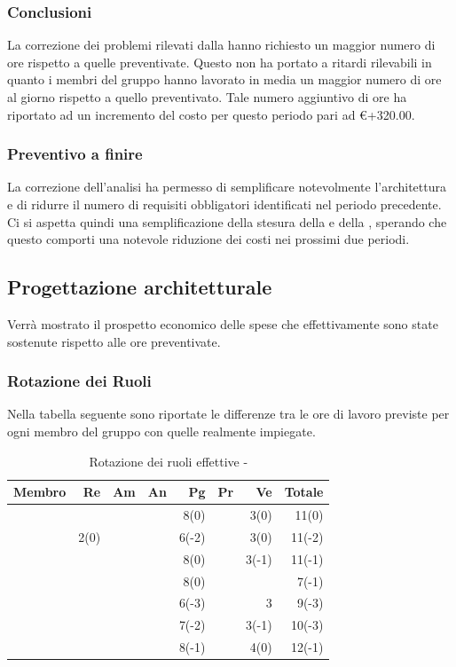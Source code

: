 \documentclass[12pt,a4paper]{article}
\begin{document}
\subsubsection{Conclusioni}
La correzione dei problemi rilevati dalla \RR{} hanno richiesto un maggior numero di ore rispetto a quelle preventivate. Questo non ha portato a ritardi rilevabili in quanto i membri del gruppo hanno lavorato in media un maggior numero di ore al giorno rispetto a quello preventivato. Tale numero aggiuntivo di ore ha riportato ad un incremento del costo per questo periodo pari ad \euro{}+320.00.

\subsubsection{Preventivo a finire}
La correzione dell'analisi ha permesso di semplificare notevolmente l'architettura e di ridurre il numero di requisiti obbligatori identificati nel periodo precedente.
Ci si aspetta quindi una semplificazione della stesura della \ST{} e della \DP{}, sperando che questo comporti una notevole riduzione dei costi nei prossimi due periodi. 

\newpage

\subsection{Progettazione architetturale}
Verrà mostrato il prospetto economico delle spese che effettivamente sono state sostenute rispetto alle ore preventivate.

\subsubsection{Rotazione dei Ruoli}
Nella tabella seguente sono riportate le differenze tra le ore di lavoro previste per ogni membro del gruppo con quelle realmente impiegate.

\begin{table}[H]
	\begin{center}
		\begin{tabular}{l r r r r r r r}
			\toprule
			\textbf{Membro}	&	\textbf{Re}	&	\textbf{Am}	& \textbf{An} & \textbf{Pg} & \textbf{Pr} & \textbf{Ve} & \textbf{Totale}\\
			\midrule
			\midrule
            \IB{} & & & & 8(0) & & 3(0) & 11(0) \\
			\midrule
            \AB{} & 2(0) & & & 6(-2) & & 3(0) & 11(-2) \\
			\midrule
            \NDC{} & & & & 8(0) & & 3(-1) & 11(-1) \\
			\midrule
            \TP{} & & & & 8(0) & & & 7(-1) \\
			\midrule
            \WS{} & & & & 6(-3) & & 3 & 9(-3) \\
			\midrule
            \AVE{} & & & & 7(-2) & & 3(-1) & 10(-3) \\
			\midrule
            \AVI{} & & & & 8(-1) & & 4(0) & 12(-1) \\
			\bottomrule
		\end{tabular}
		\caption{Rotazione dei ruoli effettive - \FPA{}}
	\end{center}
\end{table}
\end{document}
